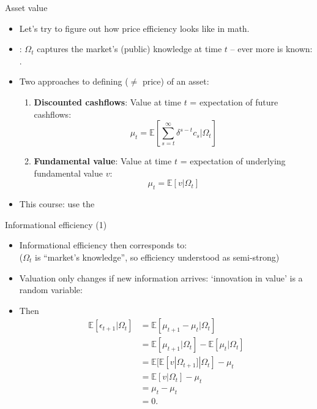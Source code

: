 \documentclass[english,10pt]{beamer}
\begin{document}
\begin{frame}{Asset value}
	\begin{itemize}
		\item Let's try to figure out how price efficiency looks like in math.
		\item {}: $\Omega_t$ captures the market's (public) knowledge at time $t$ -- ever more is known: 
		. 
		\item Two approaches to defining  ($\neq$ price) of an asset:
		\begin{enumerate}
			\item \textbf{Discounted cashflows}: Value at time $t$  = expectation of future cashflows:
			\[
			\mu_t = \mathbb{E}\left[\sum_{s=t}^{\infty} \delta^{s-t} c_s | \Omega_t \right]
			\]
			\item \textbf{Fundamental value}: Value at time $t$ = expectation of underlying fundamental value $v$:
			\[
			\mu_t = \mathbb{E} \left[ v | \Omega_t \right]
			\]
		\end{enumerate}
		\item This course: use the 
	\end{itemize}
\end{frame}


\begin{frame}{Informational efficiency (1)}
\begin{itemize}
	\item Informational efficiency then corresponds to: 
	\\
	($\Omega_t$ is ``market's knowledge'', so efficiency understood as semi-strong)
	\item Valuation only changes if new information arrives: `innovation in value' is a random variable: 
	\item Then
	\begin{align*}
		\mathbb{E}[\epsilon_{t+1}|\Omega_t] 
		& = \mathbb{E}[\mu_{t+1} - \mu_t|\Omega_t]\\
		& = \mathbb{E}[\mu_{t+1}|\Omega_t] - \mathbb{E}[\mu_t|\Omega_t]\\  
		& = \mathbb{E}[ \mathbb{E}[v|\Omega_{t+1}]|\Omega_t] - \mu_t\\  
		& = \mathbb{E}[v|\Omega_t] - \mu_t\\  
		& = \mu_t- \mu_t\\  
		& = 0.
	\end{align*}
\end{itemize}
\end{frame}
\end{document}

